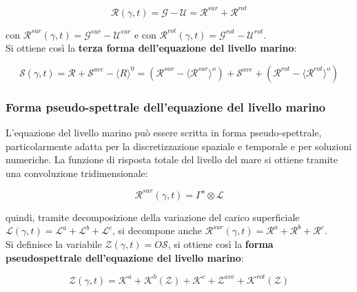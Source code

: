 \documentclass[a4paper,12pt]{book}
\begin{document}
\begin{equation}
    \mathcal{R}(\gamma,t) = \mathcal{G} - \mathcal{U} = \mathcal{R}^{sur} + \mathcal{R}^{rot}
\end{equation}

\noindent
con $\mathcal{R}^{sur} (\gamma, t) = \mathcal{G}^{sur} - \mathcal{U}^{sur}$ e con $\mathcal{R}^{rot} (\gamma, t) = \mathcal{G}^{rot} - \mathcal{U}^{rot}$.\\

\noindent Si ottiene così la \textbf{terza forma dell'equazione del livello marino}:

\begin{equation}
    \mathcal{S}(\gamma,t) = \mathcal{R} + \mathcal{S}^{ave} - \langle R \rangle^0 = (\mathcal{R}^{sur} - \langle \mathcal{R}^{sur} \rangle^o ) + \mathcal{S}^{ave} + (\mathcal{R}^{rot} - \langle\mathcal{R}^{rot} \rangle^o)
\end{equation}

\subsubsection{\textcolor{colore7}{Forma pseudo-spettrale dell'equazione del livello marino}}

L'equazione del livello marino può essere scritta in forma pseudo-spettrale,
particolarmente adatta per la discretizzazione spaziale e temporale e per soluzioni numeriche.
La funzione di risposta totale del livello del mare si ottiene tramite una convoluzione tridimensionale:

\begin{equation}
    \mathcal{R}^{sur}(\gamma,t) = \Gamma^{s} \otimes \mathcal{L}
\end{equation}

\noindent
quindi, tramite decomposizione della variazione del carico superficiale $\mathcal{L} (\gamma, t) = \mathcal{L}^a + \mathcal{L}^b + \mathcal{L}^c$,
si decompone anche $\mathcal{R}^{sur} (\gamma, t) = \mathcal{R}^a + \mathcal{R}^b + \mathcal{R}^c$.\\

\noindent
Si definisce la variabile $\mathcal{Z}(\gamma,t) = O \mathcal{S}$, si ottiene così la \textbf{forma pseudospettrale dell'equazione del livello marino}:

\begin{equation}
    \mathcal{Z}(\gamma,t) = \mathcal{K}^a + \mathcal{K}^b (\mathcal{Z}) + \mathcal{K}^c + \mathcal{Z}^{ave} + \mathcal{K}^{rot} (\mathcal{Z})
\end{equation}
\end{document}
